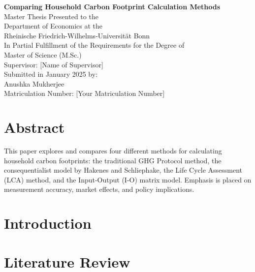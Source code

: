 \documentclass[12pt,a4paper]{article}
\begin{document}
\thispagestyle{empty}
\begin{center}
    \vspace*{2cm}
    \Huge{\textbf{Comparing Household Carbon Footprint Calculation Methods}}\\[2cm]
    \Large{Master Thesis Presented to the}\\[0.3cm]
    \Large{Department of Economics at the}\\[0.3cm]
    \Large{Rheinische Friedrich-Wilhelms-Universität Bonn}\\[1.5cm]
    \Large{In Partial Fulfillment of the Requirements for the Degree of}\\[0.3cm]
    \Large{Master of Science (M.Sc.)}\\[1.5cm]
    \Large{Supervisor: [Name of Supervisor]}\\[0.3cm]
    \Large{Submitted in January 2025 by:}\\[0.3cm]
    \Large{Anushka Mukherjee}\\[0.3cm]
    \Large{Matriculation Number: [Your Matriculation Number]}\\
\end{center}
\newpage

\tableofcontents
\newpage

\section*{Abstract}
This paper explores and compares four different methods for calculating household carbon footprints: the traditional GHG Protocol method, the consequentialist model by Hakenes and Schliephake, the Life Cycle Assessment (LCA) method, and the Input-Output (I-O) matrix model. Emphasis is placed on measurement accuracy, market effects, and policy implications.
\newpage

\section{Introduction}
\section{Literature Review}
\end{document}
